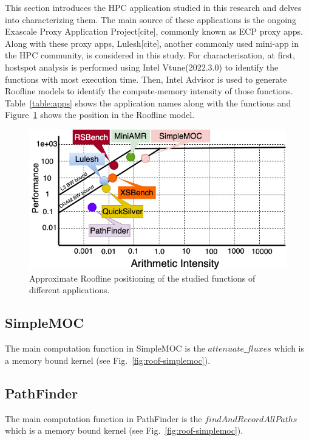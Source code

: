 
This section introduces the HPC application studied in this research and delves into characterizing them. The main source of these applications is the ongoing Exascale Proxy Application Project[cite], commonly known as ECP proxy apps. Along with these proxy apps, Lulesh[cite], another commonly used mini-app in the HPC community, is considered in this study. For characterisation, at first, hostspot analysis is performed using Intel Vtune(2022.3.0) to identify the functions with most execution time. Then, Intel Advisor is used to generate Roofline models to identify the compute-memory intensity of those functions. Table~\ref{table:apps} shows the application names along with the functions and Figure~\ref{fig:roofline} shows the position in the Roofline model.

\begin{figure}[t]%
\begin{center}
\includegraphics[width=1\linewidth]{MEMSYS22/figures/roofline/roofline_pim.png}
\end{center}
  \vspace{-0.1in}
\caption{Approximate Roofline positioning of the studied functions of different applications.}
\label{fig:roofline}
\vspace{-0.2in}
\end{figure}



\subsection{SimpleMOC}
The main computation function in SimpleMOC is the $attenuate\_fluxes$  which is a memory bound kernel (see Fig.~\ref{fig:roof-simplemoc}). 


\subsection{PathFinder}
The main computation function in PathFinder is the $findAndRecordAllPaths$  which is a memory bound kernel (see Fig.~\ref{fig:roof-simplemoc}). 




